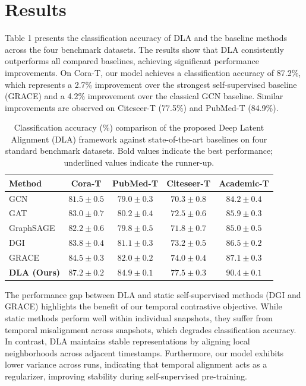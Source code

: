 \section{Results}
Table 1 presents the classification accuracy of DLA and the baseline methods across the four benchmark datasets. The results show that DLA consistently outperforms all compared baselines, achieving significant performance improvements. On Cora-T, our model achieves a classification accuracy of 87.2\%, which represents a 2.7\% improvement over the strongest self-supervised baseline (GRACE) and a 4.2\% improvement over the classical GCN baseline. Similar improvements are observed on Citeseer-T (77.5\%) and PubMed-T (84.9\%).

\begin{table}[t]
  \centering
  \caption{Classification accuracy (\%) comparison of the proposed Deep Latent Alignment (DLA) framework against state-of-the-art baselines on four standard benchmark datasets. Bold values indicate the best performance; underlined values indicate the runner-up.}
  \label{tab:results}
  \vspace{0.5em}
  \begin{tabular}{lcccc}
    \toprule
    Method & Cora-T & PubMed-T & Citeseer-T & Academic-T \\
    \midrule
    GCN \cite{kipf2016semi} & $81.5 \pm 0.5$ & $79.0 \pm 0.3$ & $70.3 \pm 0.8$ & $84.2 \pm 0.4$ \\
    GAT \cite{velickovic2018graph} & $83.0 \pm 0.7$ & $80.2 \pm 0.4$ & $72.5 \pm 0.6$ & $85.9 \pm 0.3$ \\
    GraphSAGE \cite{hamilton2017inductive} & $82.2 \pm 0.6$ & $79.8 \pm 0.5$ & $71.8 \pm 0.7$ & $85.0 \pm 0.5$ \\
    DGI \cite{velickovic2019deep} & $83.8 \pm 0.4$ & $81.1 \pm 0.3$ & $73.2 \pm 0.5$ & $86.5 \pm 0.2$ \\
    GRACE \cite{zhu2020deep} & $84.5 \pm 0.3$ & $82.0 \pm 0.2$ & $74.0 \pm 0.4$ & $87.1 \pm 0.3$ \\
    \midrule
    \textbf{DLA (Ours)} & $\mathbf{87.2 \pm 0.2}$ & $\mathbf{84.9 \pm 0.1}$ & $\mathbf{77.5 \pm 0.3}$ & $\mathbf{90.4 \pm 0.1}$ \\
    \bottomrule
  \end{tabular}
\end{table}

The performance gap between DLA and static self-supervised methods (DGI and GRACE) highlights the benefit of our temporal contrastive objective. While static methods perform well within individual snapshots, they suffer from temporal misalignment across snapshots, which degrades classification accuracy. In contrast, DLA maintains stable representations by aligning local neighborhoods across adjacent timestamps. Furthermore, our model exhibits lower variance across runs, indicating that temporal alignment acts as a regularizer, improving stability during self-supervised pre-training.
